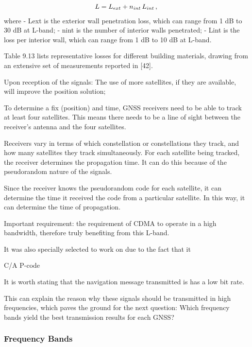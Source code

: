 \begin{equation}
    L=L_{ext}+n_{int}\,L_{int}\,,\medskip
\end{equation}
where
- Lext is the exterior wall penetration loss, which can range from 1 dB to 30 dB at L-band;
- nint is the number of interior walls penetrated;
- Lint is the loss per interior wall, which can range from 1 dB to 10 dB at L-band.

Table 9.13 lists representative losses for different building materials, drawing from an extensive set of measurements reported in [42].



Upon reception of the signals:
The use of more satellites, if they are available, will improve the position solution;

To determine a fix (position) and time, GNSS receivers need to be able to track at least four satellites. This means there needs to be a line of sight between the receiver's antenna and the four satellites.

Receivers vary in terms of which constellation or constellations they track, and how many satellites they track simultaneously. For each satellite being tracked, the receiver determines the propagation time. It can do this because of the pseudorandom nature of the signals.

Since the receiver knows the pseudorandom code for each satellite, it can determine the time it received the code from a particular satellite. In this way, it can determine the time of propagation.


Important requirement: the requirement of CDMA to operate in a high bandwidth, therefore truly benefiting from this L-band.

It was also specially selected to work on due to the fact that it 

C/A P-code~\cite{ca_p_code_1991}

It is worth stating that the navigation message transmitted is has a low bit rate.

This can explain the reason why these signals should be transmitted in high frequencies, which paves the ground for the next question: Which frequency bands yield the best transmission results for each GNSS?

\subsubsection{Frequency Bands}\label{sec:II_gnss_comm_freq_bands}

